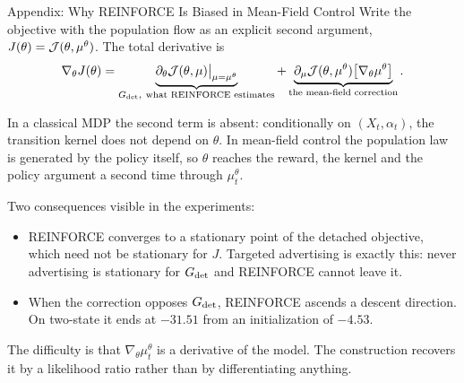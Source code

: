 \documentclass[9pt]{beamer}
\def\Jc{{\cal J}}
\begin{document}
\begin{frame}{Appendix: Why REINFORCE Is Biased in Mean-Field Control}
\small
Write the objective with the population flow as an explicit second argument, $J(\theta)=\Jc(\theta,\mu^\theta)$. The total derivative is
\[
  \nabla_\theta J(\theta)
  =
  \underbrace{\partial_\theta\Jc(\theta,\mu)\big|_{\mu=\mu^\theta}}_{G_{\rm det},\ \text{what REINFORCE estimates}}
  +
  \underbrace{\partial_\mu\Jc(\theta,\mu^\theta)\big[\nabla_\theta\mu^\theta\big]}_{\text{the mean-field correction}} .
\]

\vspace{0.15cm}
In a classical MDP the second term is absent: conditionally on $(X_t,\alpha_t)$, the transition kernel does not depend on $\theta$. In mean-field control the population law is generated by the policy itself, so $\theta$ reaches the reward, the kernel and the policy argument a second time through $\mu_t^\theta$.

\vspace{0.15cm}
Two consequences visible in the experiments:
\begin{itemize}
  \item REINFORCE converges to a stationary point of the detached objective, which need not be stationary for $J$. Targeted advertising is exactly this: never advertising is stationary for $G_{\rm det}$ and REINFORCE cannot leave it.
  \item When the correction opposes $G_{\rm det}$, REINFORCE ascends a descent direction. On two-state it ends at $-31.51$ from an initialization of $-4.53$.
\end{itemize}

\vspace{0.15cm}
The difficulty is that $\nabla_\theta\mu_t^\theta$ is a derivative of the model. The construction recovers it by a likelihood ratio rather than by differentiating anything.
\end{frame}
\end{document}
